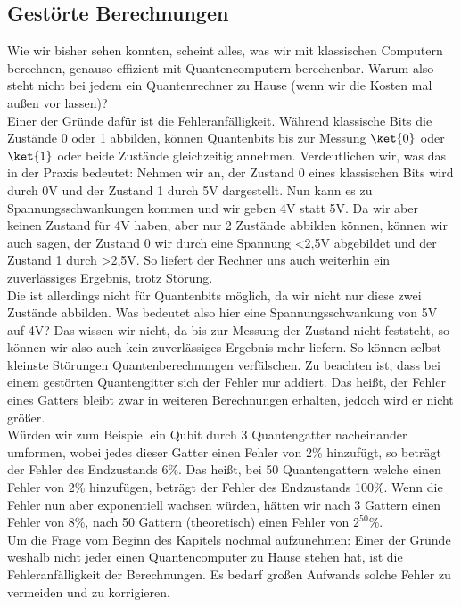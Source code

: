 \subsection{Gestörte Berechnungen}
\label{subsec:gestoerte-berechnungen}

Wie wir bisher sehen konnten, scheint alles, was wir mit klassischen Computern berechnen, genauso effizient mit Quantencomputern berechenbar.
Warum also steht nicht bei jedem ein Quantenrechner zu Hause (wenn wir die Kosten mal außen vor lassen)?\\

Einer der Gründe dafür ist die Fehleranfälligkeit.
Während klassische Bits die Zustände 0 oder 1 abbilden, können Quantenbits bis zur Messung $\ket{0}$ oder $\ket{1}$ oder beide Zustände gleichzeitig annehmen.
Verdeutlichen wir, was das in der Praxis bedeutet: Nehmen wir an, der Zustand 0 eines klassischen Bits wird durch 0V und der Zustand 1 durch 5V dargestellt.
Nun kann es zu Spannungsschwankungen kommen und wir geben 4V statt 5V\@.
Da wir aber keinen Zustand für 4V haben, aber nur 2 Zustände abbilden können, können wir auch sagen, der Zustand 0 wir durch eine Spannung <2,5V abgebildet und der Zustand 1 durch >2,5V.
So liefert der Rechner uns auch weiterhin ein zuverlässiges Ergebnis, trotz Störung.\\

Die ist allerdings nicht für Quantenbits möglich, da wir nicht nur diese zwei Zustände abbilden.
Was bedeutet also hier eine Spannungsschwankung von 5V auf 4V?
Das wissen wir nicht, da bis zur Messung der Zustand nicht feststeht, so können wir also auch kein zuverlässiges Ergebnis mehr liefern.
So können selbst kleinste Störungen Quantenberechnungen verfälschen.
Zu beachten ist, dass bei einem gestörten Quantengitter sich der Fehler nur addiert.
Das heißt, der Fehler eines Gatters bleibt zwar in weiteren Berechnungen erhalten, jedoch wird er nicht größer.\\

Würden wir zum Beispiel ein Qubit durch 3 Quantengatter nacheinander umformen, wobei jedes dieser Gatter einen Fehler von 2\% hinzufügt, so beträgt der Fehler des Endzustands 6\%.
Das heißt, bei 50 Quantengattern welche einen Fehler von 2\% hinzufügen, beträgt der Fehler des Endzustands 100\%.
Wenn die Fehler nun aber exponentiell wachsen würden, hätten wir nach 3 Gattern einen Fehler von 8\%, nach 50 Gattern (theoretisch) einen Fehler von $2^{50}$\%.\\

Um die Frage vom Beginn des Kapitels nochmal aufzunehmen: Einer der Gründe weshalb nicht jeder einen Quantencomputer zu Hause stehen hat, ist die Fehleranfälligkeit der Berechnungen.
Es bedarf großen Aufwands solche Fehler zu vermeiden und zu korrigieren.\\


